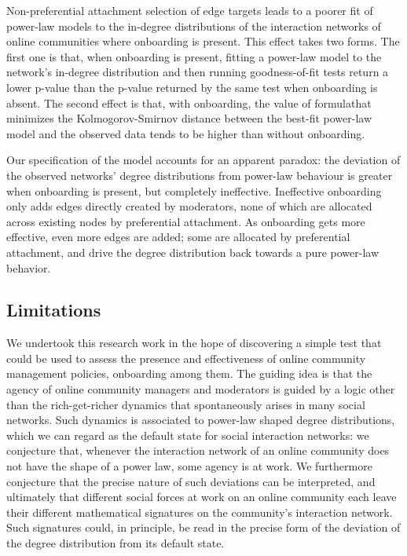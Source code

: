 Non-preferential attachment selection of edge targets leads to a poorer fit of power-law models to the in-degree distributions of the interaction networks of online communities where onboarding is present. This effect takes two forms. The first one is that, when onboarding is present, fitting a power-law model to the network's in-degree distribution and then running goodness-of-fit tests return a lower p-value than the p-value returned by the same test when onboarding is absent. The second effect is that, with onboarding, the value of formulathat minimizes the Kolmogorov-Smirnov distance between the best-fit power-law model and the observed data tends to be higher than without onboarding.

Our specification of the model accounts for an apparent paradox: the deviation of the observed networks' degree distributions from power-law behaviour is greater when onboarding is present, but completely ineffective. Ineffective onboarding only adds edges directly created by moderators, none of which are allocated across existing nodes by preferential attachment. As onboarding gets more effective, even more edges are added; some are allocated by preferential attachment, and drive the degree distribution back towards a pure power-law behavior. 

\subsection{Limitations}

We undertook this research work in the hope of discovering a simple test that could be used to assess the presence and effectiveness of online community management policies, onboarding among them. The guiding idea is that the agency of online community managers and moderators is guided by a logic other than the rich-get-richer dynamics that spontaneously arises in many social networks. Such dynamics is associated to power-law shaped degree distributions, which we can regard as the default state for social interaction networks: we conjecture that, whenever the interaction network of an online community does not have the shape of a power law, some agency is at work. We furthermore conjecture that the precise nature of such deviations can be interpreted, and ultimately that different social forces at work on an online community each leave their different mathematical signatures on the community's interaction network. Such signatures could, in principle, be read in the precise form of the deviation of the degree distribution from its default state. 

